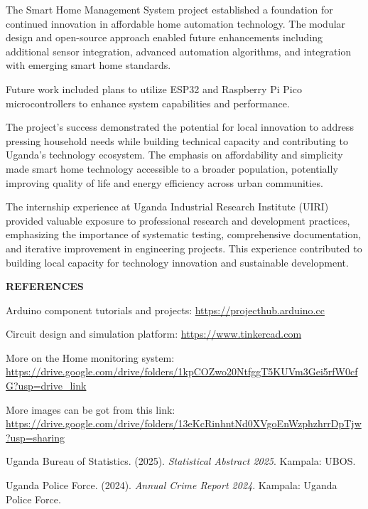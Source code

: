 \documentclass[12pt,a4paper]{report}
\begin{document}
\noindent The Smart Home Management System project established a foundation for continued innovation in affordable home automation technology. The modular design and open-source approach enabled future enhancements including additional sensor integration, advanced automation algorithms, and integration with emerging smart home standards.

\noindent Future work included plans to utilize ESP32 and Raspberry Pi Pico microcontrollers to enhance system capabilities and performance.

\noindent The project's success demonstrated the potential for local innovation to address pressing household needs while building technical capacity and contributing to Uganda's technology ecosystem. The emphasis on affordability and simplicity made smart home technology accessible to a broader population, potentially improving quality of life and energy efficiency across urban communities.

\noindent The internship experience at Uganda Industrial Research Institute (UIRI) provided valuable exposure to professional research and development practices, emphasizing the importance of systematic testing, comprehensive documentation, and iterative improvement in engineering projects. This experience contributed to building local capacity for technology innovation and sustainable development.

\newpage
{\fontsize{14}{16.8}\selectfont\bfseries\centering REFERENCES\par}
\vspace{10pt}

\noindent Arduino component tutorials and projects: 
\url{https://projecthub.arduino.cc}

\noindent Circuit design and simulation platform: 
\url{https://www.tinkercad.com}

\noindent More on the Home monitoring system: \\
\url{https://drive.google.com/drive/folders/1kpCOZwo20NtfggT5KUVm3Gei5rfW0cfG?usp=drive_link}

\noindent More images can be got from this link: \\
\url{https://drive.google.com/drive/folders/13eKcRinhntNd0XVgoEnWzphzhrrDpTjw?usp=sharing}

\noindent Uganda Bureau of Statistics. (2025). \textit{Statistical Abstract 2025}. Kampala: UBOS.

\noindent Uganda Police Force. (2024). \textit{Annual Crime Report 2024}. Kampala: Uganda Police Force.
\end{document}
